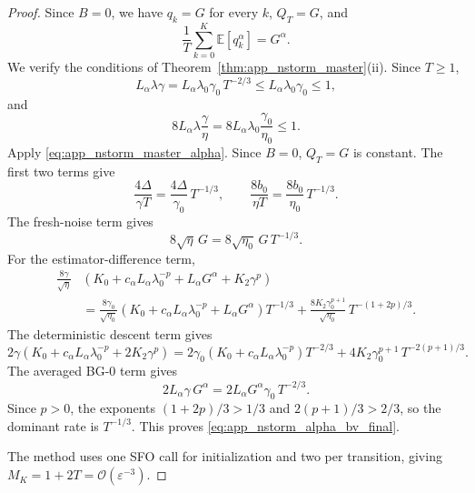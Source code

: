 \documentclass[letter,11pt]{article}
\newcommand{\E}{\mathbb{E}}
\newcommand{\Ocal}{\mathcal{O}}
\begin{document}
\begin{proof}
Since $B=0$, we have $q_k=G$ for every $k$, $Q_T=G$,
and
\[
    \frac{1}{T}\sum_{k=0}^{K}\E[q_k^\alpha] = G^\alpha.
\]
We verify the conditions of Theorem~\ref{thm:app_nstorm_master}(ii). Since
$T\ge1$,
\[
    L_\alpha\lambda\gamma
    = L_\alpha\lambda_0\gamma_0\,T^{-2/3}
    \le L_\alpha\lambda_0\gamma_0
    \le 1,
\]
and
\[
    8L_\alpha\lambda\frac{\gamma}{\eta}
    = 8L_\alpha\lambda_0\frac{\gamma_0}{\eta_0}
    \le 1.
\]
Apply \eqref{eq:app_nstorm_master_alpha}. Since $B=0$, $Q_T=G$ is constant.
The first two terms give
\[
    \frac{4\Delta}{\gamma T}
    = \frac{4\Delta}{\gamma_0}\,T^{-1/3},
    \qquad
    \frac{8b_0}{\eta T}
    = \frac{8b_0}{\eta_0}\,T^{-1/3}.
\]
The fresh-noise term gives
\[
    8\sqrt{\eta}\,G
    = 8\sqrt{\eta_0}\,G\,T^{-1/3}.
\]
For the estimator-difference term,
\[
\begin{aligned}
    \frac{8\gamma}{\sqrt{\eta}}
    &\left(
        K_0 + c_\alpha L_\alpha\lambda_0^{-p}
        + L_\alpha G^\alpha + K_2\gamma^p
    \right)
    \\
    &= \frac{8\gamma_0}{\sqrt{\eta_0}}
    \left(
        K_0 + c_\alpha L_\alpha\lambda_0^{-p}
        + L_\alpha G^\alpha
    \right) T^{-1/3}
    + \frac{8K_2\gamma_0^{p+1}}{\sqrt{\eta_0}}\,T^{-(1+2p)/3}.
\end{aligned}
\]
The deterministic descent term gives
\[
    2\gamma
    \left(
        K_0 + c_\alpha L_\alpha\lambda_0^{-p}
        + 2K_2\gamma^p
    \right)
    = 2\gamma_0
    \left(
        K_0 + c_\alpha L_\alpha\lambda_0^{-p}
    \right) T^{-2/3}
    + 4K_2\gamma_0^{p+1}\,T^{-2(p+1)/3}.
\]
The averaged BG-0 term gives
\[
    2L_\alpha\gamma\,G^\alpha
    = 2L_\alpha G^\alpha\gamma_0\,T^{-2/3}.
\]
Since $p>0$, the exponents $(1+2p)/3 > 1/3$ and $2(p+1)/3 > 2/3$, so the
dominant rate is $T^{-1/3}$. This proves
\eqref{eq:app_nstorm_alpha_bv_final}.

The method uses one SFO call for initialization and two per transition, giving
$M_K=1+2T=\Ocal(\varepsilon^{-3})$.
\end{proof}
\end{document}
